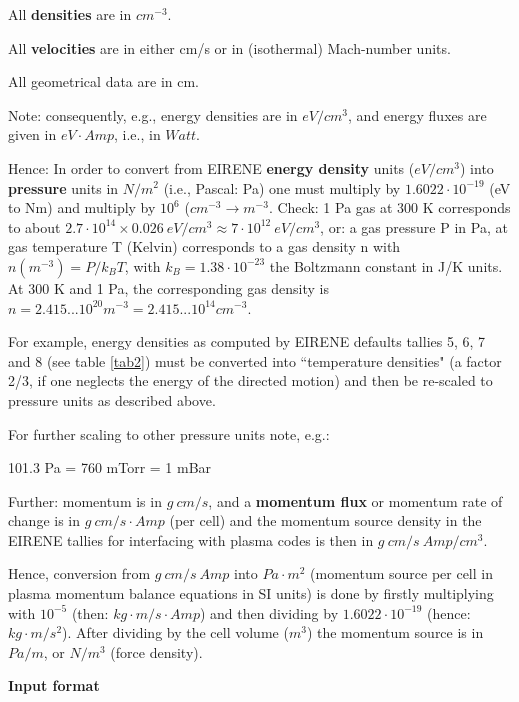 All \textbf{densities} are in $cm^{-3}$.

All \textbf{velocities} are in either cm/s or in (isothermal) Mach-number units.

All geometrical data are in cm.

Note: consequently, e.g., energy densities are in $eV/cm^3$, and
energy fluxes are given in $eV \cdot Amp$, i.e., in $Watt$.

Hence: In order to convert from EIRENE {\bf energy density} units ($eV/cm^3$) into  {\bf pressure}
units in $N/m^2$
(i.e., Pascal: Pa) one must multiply by $1.6022 \cdot 10^{-19}$ (eV to Nm)
and multiply by $10^6$ ($cm^{-3} \rightarrow m^{-3}$. Check: 1 Pa gas at 300 K corresponds to
about $2.7 \cdot 10^{14} \times 0.026~ eV/cm^3 \approx 7 \cdot 10^{12}~ eV/cm^3$, or:
a gas pressure P in Pa, at gas temperature T (Kelvin) corresponds to a gas density n with $n (m^{-3}) = P/k_B T$,
with $k_B =1.38 \cdot 10^{-23}$ the Boltzmann constant in J/K units. At 300 K and 1 Pa, the corresponding gas density is $n=2.415...10^{20} m^{-3} = 2.415...10^{14} cm^{-3}$.

For example, energy densities as computed by EIRENE defaults
tallies 5, 6, 7 and 8 (see table \ref{tab2}) must be converted into
``temperature densities" (a factor 2/3, if one neglects the energy
of the directed motion) and then be re-scaled to pressure units as
described above.

For further scaling to other pressure units note, e.g.:

101.3 Pa = 760 mTorr = 1 mBar


Further: momentum is in $g~cm/s$, and a {\bf momentum flux}
or momentum rate of change
is in $g~cm/s \cdot Amp$ (per cell) and the momentum source density
in the EIRENE tallies for interfacing with plasma codes is then in
$g~cm/s~Amp /cm^3$.

Hence, conversion from
$g~cm/s~Amp $
into $Pa \cdot m^2$ (momentum source per cell in plasma momentum
balance equations in SI units) is done by firstly multiplying with $10^{-5}$
(then: $kg \cdot m/s \cdot Amp$)
and then dividing by
$1.6022 \cdot 10^{-19}$ (hence: $kg \cdot m/s^2$).
After dividing by the cell volume ($m^3$)
the momentum source is in $Pa/m$, or $N/m^3$ (force density).


\medskip

\noindent

{\bf Input format}

\medskip

\noindent

